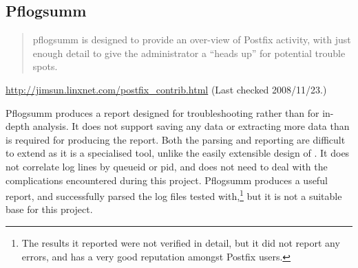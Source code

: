 %

\subsection{Pflogsumm}

\begin{quotation}

    pflogsumm is designed to provide an over-view of Postfix activity, with
    just enough detail to give the administrator a ``heads up'' for
    potential trouble spots.

\end{quotation}

\noindent{}\url{http://jimsun.linxnet.com/postfix_contrib.html} \newline{}
(Last checked 2008/11/23.)

Pflogsumm produces a report designed for troubleshooting rather than for
in-depth analysis.  It does not support saving any data or extracting more
data than is required for producing the report.  Both the parsing and
reporting are difficult to extend as it is a specialised tool, unlike the
easily extensible design of \parsername{}.  It does not correlate log lines
by queueid or \gls{pid}, and does not need to deal with the complications
encountered during this project.  Pflogsumm produces a useful report, and
successfully parsed the \numberOFlogFILES{} log files tested
with,\footnote{The results it reported were not verified in detail, but it
did not report any errors, and has a very good reputation amongst Postfix
users.} but it is not a suitable base for this project.

